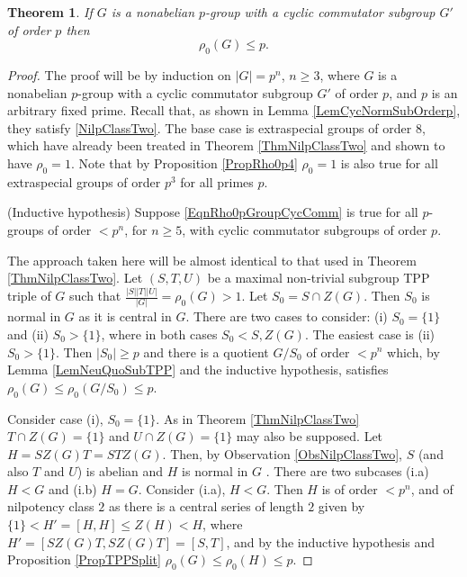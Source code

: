 \documentclass{amsart}
\newtheorem{theorem}{Theorem}[section]
\theoremstyle{observation}
\theoremstyle{definition}
\theoremstyle{remark}
\numberwithin{equation}{section}
\begin{document}
\begin{theorem}\label{ThmRho0pGroupCycComm} If $G$ is a nonabelian $p$-group with a cyclic commutator subgroup $G'$ of order $p$ then
\begin{equation}\label{EqnRho0pGroupCycComm} \rho_0(G) \leq p.
\end{equation}
\end{theorem}
\begin{proof} The proof will be by induction on $|G| = p^n$, $n \geq 3$, where $G$ is a nonabelian $p$-group with a cyclic commutator subgroup $G'$ of order $p$, and $p$ is an arbitrary fixed prime. Recall that, as shown in Lemma \ref{LemCycNormSubOrderp}, they satisfy \ref{NilpClassTwo}. The base case is extraspecial groups of order $8$, which have already been treated in Theorem \ref{ThmNilpClassTwo} and shown to have $\rho_0 = 1$. Note that by Proposition \ref{PropRho0p4} $\rho_0 = 1$ is also true for all extraspecial groups of order $p^3$ for all primes $p$.

(Inductive hypothesis) Suppose \ref{EqnRho0pGroupCycComm} is true for all $p$-groups of order $< p^n$, for $n \geq 5$, with cyclic commutator subgroups of order $p$.

\vspace{1mm}

The approach taken here will be almost identical to that used in Theorem \ref{ThmNilpClassTwo}. Let $(S, T, U)$ be a maximal non-trivial subgroup TPP triple of $G$ such that $\frac{|S||T||U|}{|G|} = \rho_0(G) > 1$. Let $S_0 = S \cap Z(G)$. Then $S_0$ is normal in $G$ as it is central in $G$. There are two cases to consider: \textup{(i)} $S_0 = \{1\}$ and \textup{(ii)} $S_0 > \{1\}$, where in both cases $S_0 < S, Z(G)$. The easiest case is \textup{(ii)} $S_0 > \{1\}$. Then $|S_0| \geq p$ and there is a quotient $G/S_0$ of order $< p^n$ which, by Lemma \ref{LemNeuQuoSubTPP} and the inductive hypothesis, s{}atisfies $\rho_0(G) \leq \rho_0(G/S_0) \leq p$.

\vspace{1mm}

Consider case \textup{(i)}, $S_0 = \{1\}$. As in Theorem \ref{ThmNilpClassTwo} $T \cap Z(G) = \{1\}$ and $U \cap Z(G) = \{1\}$ may also be supposed. Let $H = SZ(G)T = STZ(G)$. Then, by Observation \ref{ObsNilpClassTwo}, $S$ (and also $T$ and $U$) is abelian and $H$ is normal in $G$ . There are two subcases \textup{(i.a)} $H < G$ and \textup{(i.b)} $H = G$. Consider \textup{(i.a)}, $H < G$. Then $H$ is of order $< p^n$, and of nilpotency class $2$ as there is a central series of length $2$ given by $\{1\} < H' = [H, H] \leq Z(H) < H$, where $H' = [SZ(G)T, SZ(G)T] = [S, T]$, and by the inductive hypothesis and Proposition \ref{PropTPPSplit} $\rho_0(G) \leq \rho_0(H) \leq p$.


\end{proof}
\end{document}
